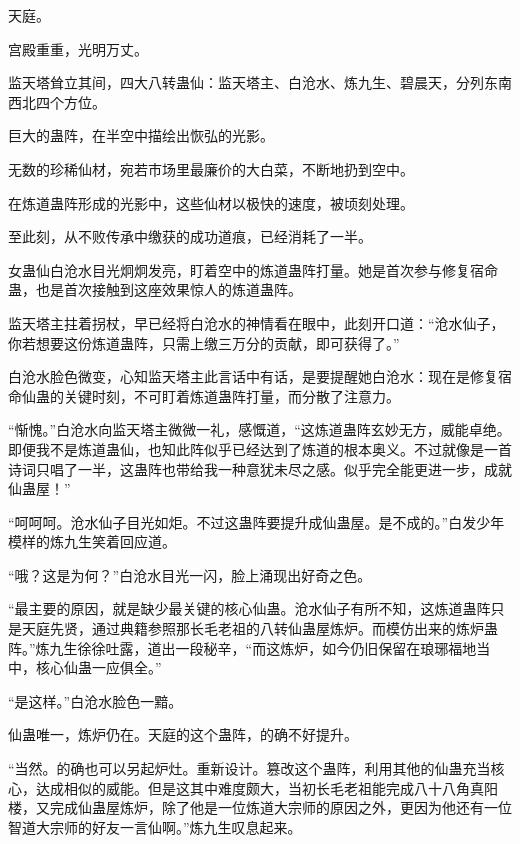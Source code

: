 
\begin{this_body}

天庭。

宫殿重重，光明万丈。

监天塔耸立其间，四大八转蛊仙：监天塔主、白沧水、炼九生、碧晨天，分列东南西北四个方位。

巨大的蛊阵，在半空中描绘出恢弘的光影。

无数的珍稀仙材，宛若市场里最廉价的大白菜，不断地扔到空中。

在炼道蛊阵形成的光影中，这些仙材以极快的速度，被顷刻处理。

至此刻，从不败传承中缴获的成功道痕，已经消耗了一半。

女蛊仙白沧水目光炯炯发亮，盯着空中的炼道蛊阵打量。她是首次参与修复宿命蛊，也是首次接触到这座效果惊人的炼道蛊阵。

监天塔主拄着拐杖，早已经将白沧水的神情看在眼中，此刻开口道：“沧水仙子，你若想要这份炼道蛊阵，只需上缴三万分的贡献，即可获得了。”

白沧水脸色微变，心知监天塔主此言话中有话，是要提醒她白沧水：现在是修复宿命仙蛊的关键时刻，不可盯着炼道蛊阵打量，而分散了注意力。

“惭愧。”白沧水向监天塔主微微一礼，感慨道，“这炼道蛊阵玄妙无方，威能卓绝。即便我不是炼道蛊仙，也知此阵似乎已经达到了炼道的根本奥义。不过就像是一首诗词只唱了一半，这蛊阵也带给我一种意犹未尽之感。似乎完全能更进一步，成就仙蛊屋！”

“呵呵呵。沧水仙子目光如炬。不过这蛊阵要提升成仙蛊屋。是不成的。”白发少年模样的炼九生笑着回应道。

“哦？这是为何？”白沧水目光一闪，脸上涌现出好奇之色。

“最主要的原因，就是缺少最关键的核心仙蛊。沧水仙子有所不知，这炼道蛊阵只是天庭先贤，通过典籍参照那长毛老祖的八转仙蛊屋炼炉。而模仿出来的炼炉蛊阵。”炼九生徐徐吐露，道出一段秘辛，“而这炼炉，如今仍旧保留在琅琊福地当中，核心仙蛊一应俱全。”

“是这样。”白沧水脸色一黯。

仙蛊唯一，炼炉仍在。天庭的这个蛊阵，的确不好提升。

“当然。的确也可以另起炉灶。重新设计。篡改这个蛊阵，利用其他的仙蛊充当核心，达成相似的威能。但是这其中难度颇大，当初长毛老祖能完成八十八角真阳楼，又完成仙蛊屋炼炉，除了他是一位炼道大宗师的原因之外，更因为他还有一位智道大宗师的好友一言仙啊。”炼九生叹息起来。


\end{this_body}
